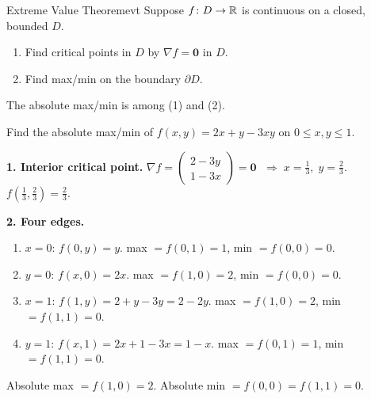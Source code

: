 \begin{theorem}{Extreme Value Theorem}{evt}
  Suppose $f\colon D\to\mathbb{R}$ is continuous on a closed, bounded $D$.
  \begin{enumerate}[nosep]
    \item Find critical points in $D$ by $\nabla f=\mathbf{0}$ in $D$.
    \item Find max/min on the boundary $\partial D$.
  \end{enumerate}
  The absolute max/min is among (1) and (2).
\end{theorem}

\begin{example}
  Find the absolute max/min of $f(x,y)=2x+y-3xy$ on $0\le x,y\le 1$.

  \begin{center}
  \end{center}

  \textbf{1. Interior critical point.}
  $\nabla f =
    \begin{pmatrix}
      2-3y \\1-3x
    \end{pmatrix}
    = \mathbf{0}$
  $\;\Longrightarrow\; x=\tfrac{1}{3},\; y=\tfrac{2}{3}$.
  \; $f(\tfrac{1}{3},\tfrac{2}{3})=\tfrac{2}{3}$.

  \textbf{2. Four edges.}
  \begin{enumerate}[nosep]
    \item $x=0$: $f(0,y)=y$. \; max $=f(0,1)=1$, min $=f(0,0)=0$.
    \item $y=0$: $f(x,0)=2x$. \; max $=f(1,0)=2$, min $=f(0,0)=0$.
    \item $x=1$: $f(1,y)=2+y-3y=2-2y$. \; max $=f(1,0)=2$, min $=f(1,1)=0$.
    \item $y=1$: $f(x,1)=2x+1-3x=1-x$. \; max $=f(0,1)=1$, min $=f(1,1)=0$.
  \end{enumerate}

  Absolute max $=f(1,0)=2$. \;
  Absolute min $=f(0,0)=f(1,1)=0$.
\end{example}


